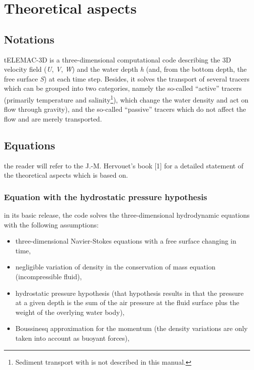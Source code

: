 \chapter{Theoretical aspects}


\section{Notations}

tELEMAC-3D is a three-dimensional computational code describing the 3D
velocity field (\textit{U}, \textit{V}, \textit{W}) and the water depth
\textit{h} (and, from the bottom depth, the free surface \textit{S}) at each
time step. Besides, it solves the transport of several tracers which can be
grouped into two categories, namely the so-called ``active'' tracers (primarily
temperature and salinity\footnote{ Sediment transport with  is not
described in this manual.}), which change the water density and act on flow
through gravity), and the so-called ``passive'' tracers which do not affect the
flow and are merely transported.

\section{Equations}

the reader will refer to the J.-M. Hervouet's book [1] for a detailed statement
of the theoretical aspects which  is based on.

\subsection{Equation with the hydrostatic pressure hypothesis}

in its basic release, the code solves the three-dimensional hydrodynamic
equations with the following assumptions:

\begin{itemize}
\item three-dimensional Navier-Stokes equations with a free surface changing
in time,
\item negligible variation of density in the conservation of mass equation
(incompressible fluid),
\item hydrostatic pressure hypothesis (that hypothesis results in that the
pressure at a given depth is the sum of the air pressure at the fluid surface
plus the weight of the overlying water body),
\item Boussinesq approximation for the momentum (the density variations are
only taken into account as buoyant forces),
\end{itemize}


